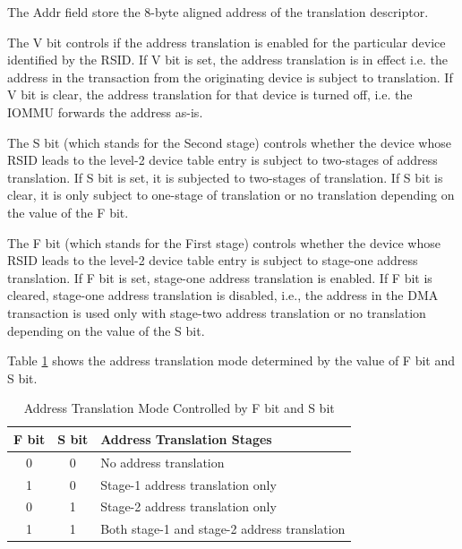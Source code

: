 The Addr field store the 8-byte aligned address of the translation descriptor.

The V bit controls if the address translation is enabled for the particular device
identified by the RSID. If V bit is set, the address translation is in effect i.e. the
address in the transaction from the originating device is subject to translation. If V bit
is clear, the address translation for that device is turned off, i.e. the IOMMU forwards
the address as-is.

The S bit (which stands for the Second stage) controls whether the device whose RSID leads to
the level-2 device table entry is subject to two-stages of address translation. If S bit
is set, it is subjected to two-stages of translation. If S bit is clear, it is only
subject to one-stage of translation or no translation depending on the value of the F bit.

The F bit (which stands for the First stage) controls whether the device whose RSID leads
to the level-2 device table entry is subject to stage-one address translation. If F bit is
set, stage-one address translation is enabled. If F bit is cleared, stage-one address
translation is disabled, i.e., the address in the DMA transaction is used only with
stage-two address translation or no translation depending on the value of the S bit.

Table \ref{tbl:fbit-sbit-addr-trans} shows the address translation mode determined by the
value of F bit and S bit.

\begin{table}[h!t]
    \centering
    \begin{tabular}{ | c | c | l | }

    \hline
     F bit & S bit   &  Address Translation Stages \\
    \hline
     0     & 0       &  No address translation \\
    \hline
     1     & 0       &  Stage-1 address translation only \\
    \hline
     0     & 1       &  Stage-2 address translation only \\
    \hline
     1     & 1       &  Both stage-1 and stage-2 address translation \\
    \hline

    \end{tabular}
    \caption{Address Translation Mode Controlled by F bit and S bit}
    \label{tbl:fbit-sbit-addr-trans}
\end{table}

